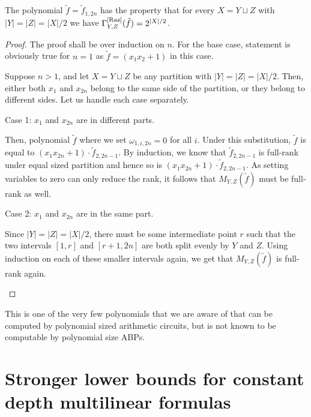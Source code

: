 \begin{lemma}[\cite{ry08}]\label{lem:fullrankpoly}
The polynomial $\tilde{f} = \tilde{f}_{1,2n}$ has the property that for every $X = Y \sqcup Z$ with $|Y| = |Z| = |X|/2$ we have $\Gamma^{\mathrm{[Raz]}}_{Y,Z}(\tilde{f}) = 2^{|X|/2}$. 
\end{lemma}
\begin{proof}
The proof shall be over induction on $n$. 
For the base case, statement is obviously true for $n = 1$ as $\tilde{f} = (x_1x_2 + 1)$ in this case. 

Suppose $n > 1$, and let $X = Y \sqcup Z$ be any partition with $|Y| = |Z| = |X|/2$. 
Then, either both $x_1$ and $x_{2n}$ belong to the same side of the partition, or they belong to different sides. 
Let us handle each case separately. 

\begin{description}
\item{Case 1:  $x_1$ and $x_{2n}$ are in different parts}. 

Then, polynomial $\tilde{f}$ where we set $\omega_{1,i,2n} = 0$ for all $i$. 
Under this substitution, $\tilde{f}$ is equal to $(x_1x_{2n}+ 1)\cdot \tilde{f}_{2,2n-1}$. 
By induction, we know that $\tilde{f}_{2,2n-1}$ is full-rank under equal sized partition and hence so is $(x_1 x_{2n} + 1) \cdot \tilde{f}_{2,2n-1}$. 
As setting variables to zero can only reduce the rank, it follows that $M_{Y,Z}(\tilde{f})$ must be full-rank as well. 

\item{Case 2:  $x_1$ and $x_{2n}$ are in the same part}. 

Since $|Y| = |Z| = |X|/2$, there must be some intermediate point $r$ such that the two intervals $[1,r]$ and $[r+1,2n]$ are both split evenly by $Y$ and $Z$. 
Using induction on each of these smaller intervals again, we get that $M_{Y,Z}(\tilde{f})$ is full-rank again. 
\end{description}
\end{proof}

This is one of the very few polynomials that we are aware of that can be computed by polynomial sized arithmetic circuits, but is not known to be computable by polynomial size ABPs. 

\section{Stronger lower bounds for constant depth multilinear formulas}

